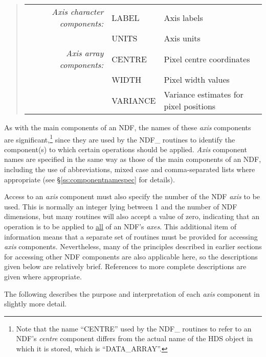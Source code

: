 \documentclass[twoside,11pt]{article}
\newcommand{\xref}[3]{#1}
\newcommand{\st}[1]{{\em{#1}}}
\begin{document}
\small
\begin{quote}
\begin{center}
\begin{tabular}{rl@{ --- }l}
\st{Axis character components:} & LABEL & Axis labels \\
                                 & UNITS & Axis units \\[1.5ex]
    \st{Axis array components:} & CENTRE & Pixel centre coordinates \\
                                 & WIDTH  & Pixel width values \\
                                 & VARIANCE & Variance estimates for pixel
                                              positions
\end{tabular}
\end{center}
\end{quote}
\normalsize

As with the main components of an NDF, the names of these \st{axis\/}
components are significant,\footnote{Note that the name ``CENTRE'' used by
the NDF\_ routines to refer to an NDF's \st{centre\/} component differs
from the actual name of the \xref{HDS}{sun92}{} object in which it is stored, which is
``DATA\_ARRAY''.} since they are used by the NDF\_ routines to identify the
component(s) to which certain operations should be applied. 
\st{Axis\/} component names are specified in the same way as those of the
main components of an NDF, including the use of abbreviations, mixed case
and comma-separated lists where appropriate (see
\S\ref{ss:componentnamespec} for details). 

Access to an \st{axis\/} component must also specify the number of the NDF
\st{axis} to be used.
This is normally an integer lying between 1 and the number of NDF
dimensions, but many routines will also accept a value of zero, indicating
that an operation is to be applied to \underline{all} of an NDF's \st{axes}. 
This additional item of information means that a separate set of routines
must be provided for accessing \st{axis\/} components. 
Nevertheless, many of the principles described in earlier sections for
accessing other NDF components are also applicable here, so the descriptions
given below are relatively brief.
References to more complete descriptions are given where appropriate. 

The following describes the purpose and interpretation of each \st{axis\/}
component in slightly more detail. 
\end{document}
